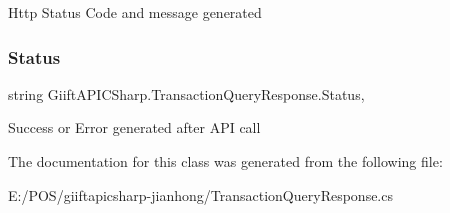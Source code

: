 Http Status Code and message generated 

\mbox{\label{class_giift_a_p_i_c_sharp_1_1_transaction_query_response_ab312fb4e4842fece2d5221235e51771a}} 
\subsubsection{\texorpdfstring{Status}{Status}}
{\footnotesize\ttfamily string Giift\+A\+P\+I\+C\+Sharp.\+Transaction\+Query\+Response.\+Status\hspace{0.3cm}{\ttfamily [get]}, {\ttfamily [set]}}



Success or Error generated after A\+PI call 



The documentation for this class was generated from the following file\+:\begin{DoxyCompactItemize}
\item 
E\+:/\+P\+O\+S/giiftapicsharp-\/jianhong/Transaction\+Query\+Response.\+cs\end{DoxyCompactItemize}
